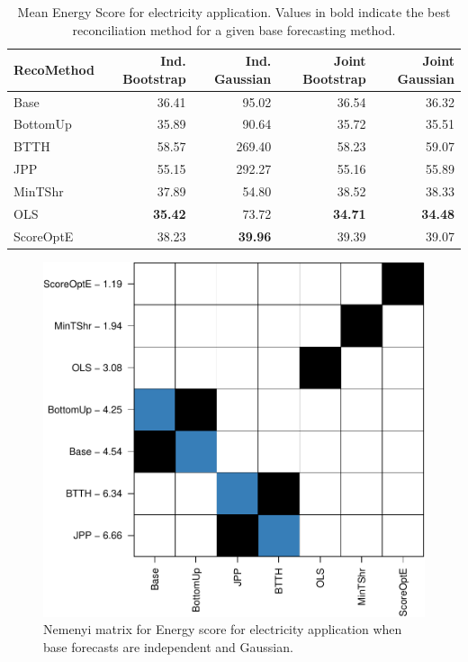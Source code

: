 \documentclass[11pt]{article}
\theoremstyle{definition}
\begin{document}
\begin{table}[H]
\footnotesize
\centering
\caption{\label{tab:appres} Mean Energy Score for electricity application. Values in bold indicate the best reconciliation method for a given base forecasting method.}

\begin{tabular}{l|r|r|r|r}
	\hline
	RecoMethod & Ind. Bootstrap & Ind. Gaussian & Joint Bootstrap & Joint Gaussian\\
	\hline
	Base & 36.41 & 95.02 & 36.54 & 36.32\\
	\hline
	BottomUp & 35.89 & 90.64 & 35.72 & 35.51\\
	\hline
	BTTH & 58.57 & 269.40 & 58.23 & 59.07\\
	\hline
	JPP & 55.15 & 292.27 & 55.16 & 55.89\\
	\hline
	MinTShr & 37.89 & 54.80 & 38.52 & 38.33\\
	\hline
	OLS & \textbf{35.42} & 73.72 & \textbf{34.71} & \textbf{34.48}\\
	\hline
	ScoreOptE & 38.23 & \textbf{39.96} & 39.39 & 39.07\\
	\hline
\end{tabular}

\end{table}

\begin{figure}
	\centering
	\includegraphics[width=.4\textheight]{Figs/nemenyi_ig.pdf}
	\caption{Nemenyi matrix for Energy score for electricity application when base forecasts are independent and Gaussian.}
		\label{fig:nem_app_ig}
\end{figure}
\end{document}
